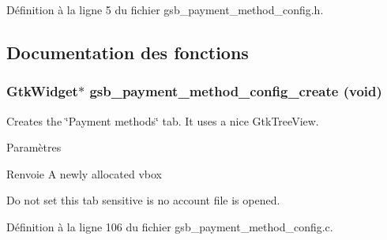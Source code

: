 Définition à la ligne 5 du fichier gsb\_\-payment\_\-method\_\-config.h.



\subsection{Documentation des fonctions}
\subsubsection[{gsb\_\-payment\_\-method\_\-config\_\-create}]{\setlength{\rightskip}{0pt plus 5cm}GtkWidget$\ast$ gsb\_\-payment\_\-method\_\-config\_\-create (void)}\label{gsb__payment__method__config_8h_ae9065f6711790bf2affea09548462a21}
Creates the \char`\"{}Payment methods\char`\"{} tab. It uses a nice GtkTreeView.


\begin{DoxyParams}{Paramètres}
\item[{\em }]\end{DoxyParams}
\begin{DoxyReturn}{Renvoie}
A newly allocated vbox 
\end{DoxyReturn}


Do not set this tab sensitive is no account file is opened. 



Définition à la ligne 106 du fichier gsb\_\-payment\_\-method\_\-config.c.

